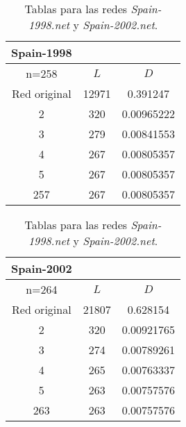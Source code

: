 \begin{table}[H]
\begin{minipage}{0.45\textwidth}
  \begin{tabular}{ccc}
  Spain-1998 & & \\
  \hline
  n=258              &   $L$ &   $D$ \\
  \hline
  Red original &               12971 & 0.391247   \\
  2            &                 320 & 0.00965222 \\
  3            &                 279 & 0.00841553 \\
  4            &                 267 & 0.00805357 \\
  5            &                 267 & 0.00805357 \\
  257          &                 267 & 0.00805357 \\
  \hline
  \end{tabular}
\end{minipage}
\begin{minipage}{0.45\textwidth}
  \begin{tabular}{ccc}
    Spain-2002 & & \\
    \hline
    n=264              &   $L$ &   $D$ \\
    \hline
    Red original &               21807 & 0.628154   \\
    2            &                 320 & 0.00921765 \\
    3            &                 274 & 0.00789261 \\
    4            &                 265 & 0.00763337 \\
    5            &                 263 & 0.00757576 \\
    263          &                 263 & 0.00757576 \\
    \hline
  \end{tabular}
\end{minipage}
\label{sp98-sp02}
\caption{Tablas para las redes \textit{Spain-1998.net} y \textit{Spain-2002.net}.}
\end{table}
